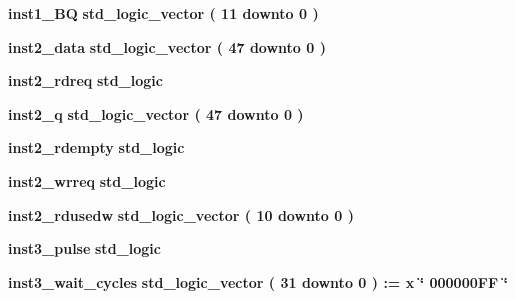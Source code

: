 \begin{DoxyCompactItemize}
\item 
{\bf inst1\+\_\+\+BQ} {\bfseries \textcolor{comment}{std\+\_\+logic\+\_\+vector}\textcolor{vhdlchar}{ }\textcolor{vhdlchar}{(}\textcolor{vhdlchar}{ }\textcolor{vhdlchar}{ } \textcolor{vhdldigit}{11} \textcolor{vhdlchar}{ }\textcolor{keywordflow}{downto}\textcolor{vhdlchar}{ }\textcolor{vhdlchar}{ } \textcolor{vhdldigit}{0} \textcolor{vhdlchar}{ }\textcolor{vhdlchar}{)}\textcolor{vhdlchar}{ }} 
\item 
{\bf inst2\+\_\+data} {\bfseries \textcolor{comment}{std\+\_\+logic\+\_\+vector}\textcolor{vhdlchar}{ }\textcolor{vhdlchar}{(}\textcolor{vhdlchar}{ }\textcolor{vhdlchar}{ } \textcolor{vhdldigit}{47} \textcolor{vhdlchar}{ }\textcolor{keywordflow}{downto}\textcolor{vhdlchar}{ }\textcolor{vhdlchar}{ } \textcolor{vhdldigit}{0} \textcolor{vhdlchar}{ }\textcolor{vhdlchar}{)}\textcolor{vhdlchar}{ }} 
\item 
{\bf inst2\+\_\+rdreq} {\bfseries \textcolor{comment}{std\+\_\+logic}\textcolor{vhdlchar}{ }} 
\item 
{\bf inst2\+\_\+q} {\bfseries \textcolor{comment}{std\+\_\+logic\+\_\+vector}\textcolor{vhdlchar}{ }\textcolor{vhdlchar}{(}\textcolor{vhdlchar}{ }\textcolor{vhdlchar}{ } \textcolor{vhdldigit}{47} \textcolor{vhdlchar}{ }\textcolor{keywordflow}{downto}\textcolor{vhdlchar}{ }\textcolor{vhdlchar}{ } \textcolor{vhdldigit}{0} \textcolor{vhdlchar}{ }\textcolor{vhdlchar}{)}\textcolor{vhdlchar}{ }} 
\item 
{\bf inst2\+\_\+rdempty} {\bfseries \textcolor{comment}{std\+\_\+logic}\textcolor{vhdlchar}{ }} 
\item 
{\bf inst2\+\_\+wrreq} {\bfseries \textcolor{comment}{std\+\_\+logic}\textcolor{vhdlchar}{ }} 
\item 
{\bf inst2\+\_\+rdusedw} {\bfseries \textcolor{comment}{std\+\_\+logic\+\_\+vector}\textcolor{vhdlchar}{ }\textcolor{vhdlchar}{(}\textcolor{vhdlchar}{ }\textcolor{vhdlchar}{ } \textcolor{vhdldigit}{10} \textcolor{vhdlchar}{ }\textcolor{keywordflow}{downto}\textcolor{vhdlchar}{ }\textcolor{vhdlchar}{ } \textcolor{vhdldigit}{0} \textcolor{vhdlchar}{ }\textcolor{vhdlchar}{)}\textcolor{vhdlchar}{ }} 
\item 
{\bf inst3\+\_\+pulse} {\bfseries \textcolor{comment}{std\+\_\+logic}\textcolor{vhdlchar}{ }} 
\item 
{\bf inst3\+\_\+wait\+\_\+cycles} {\bfseries \textcolor{comment}{std\+\_\+logic\+\_\+vector}\textcolor{vhdlchar}{ }\textcolor{vhdlchar}{(}\textcolor{vhdlchar}{ }\textcolor{vhdlchar}{ } \textcolor{vhdldigit}{31} \textcolor{vhdlchar}{ }\textcolor{keywordflow}{downto}\textcolor{vhdlchar}{ }\textcolor{vhdlchar}{ } \textcolor{vhdldigit}{0} \textcolor{vhdlchar}{ }\textcolor{vhdlchar}{)}\textcolor{vhdlchar}{ }\textcolor{vhdlchar}{ }\textcolor{vhdlchar}{ }\textcolor{vhdlchar}{\+:}\textcolor{vhdlchar}{=}\textcolor{vhdlchar}{ }\textcolor{vhdlchar}{ }\textcolor{vhdlchar}{x}\textcolor{vhdlchar}{ }\textcolor{keyword}{\char`\"{} 000000\+F\+F \char`\"{}}\textcolor{vhdlchar}{ }} 

\end{DoxyCompactItemize}
